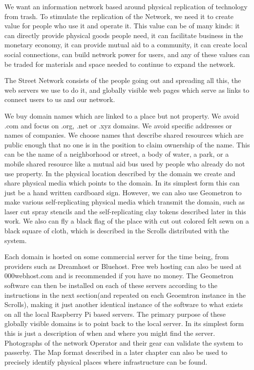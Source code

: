 We want an information network based around physical replication of technology from trash.  To stimulate the replication of the Network, we need it to create value for people who use it and operate it. This value can be of many kinds: it can directly provide physical goods people need, it can facilitate business in the monetary economy, it can provide mutual aid to a community, it can create local social connections, can build network power for users, and any of these values can be traded for materials and space needed to continue to expand the network.  

The Street Network consists of the people going out and spreading all this, the web servers we use to do it, and globally visible web pages which serve as links to connect users to us and our network.  

We buy domain names which are linked to a place but not property.  We avoid .com  and focus on .org, .net or .xyz domains.  We avoid specific addresses or names of companies.  We choose names that describe shared resources which are public enough that no one is in the position to claim ownership of the name.  This can be the name of a neighborhood or street, a body of water, a park, or a mobile shared resource like a mutual aid bus used by people who already do not use property.  In the physical location described by the domain we create and share physical media which points to the domain.  In its simplest form this can just be a hand written cardboard sign.  However, we can also use Geometron to make various self-replicating physical media which transmit the domain, such as laser cut spray stencils and the self-replicating clay tokens described later in this work.   We also can fly a black flag of the place with cut out colored felt sewn on a black square of cloth, which is described in the Scrolls distributed with the system. 

Each domain is hosted on some commercial server for the time being, from providers such as Dreamhost or Bluehost.  Free web hosting can also be used at 000webhost.com and is recommended if you have no money.  The Geometron software can then be installed on each of these servers according to the instructions in the next section(and repeated on each Geoemtron instance in the Scrolls), making it just another identical instance of the software to what exists on all the local Raspberry Pi based servers.   The primary purpose of these globally visible domains is to point back to the local server.  In its simplest form this is just a description of when and where you might find the server.  Photographs of the network Operator and their gear can validate the system to passerby.  The Map format described in a later chapter can also be used to precisely identify physical places where infrastructure can be found.


